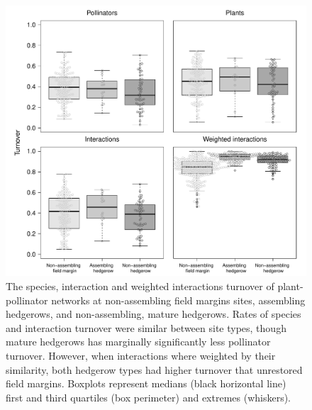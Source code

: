 \documentclass[12pt]{article}
\begin{document}
\begin{figure}
  \centering
  \includegraphics[width=1\textwidth]{../analysis/variability/figures/turnover_panels.pdf}
  \caption{The species, interaction and weighted interactions turnover
    of plant-pollinator networks at non-assembling field margins
    sites, assembling hedgerows, and non-assembling, mature
    hedgerows. Rates of species and interaction turnover were similar
    between site types, though mature hedgerows has marginally
    significantly less pollinator turnover.  However, when
    interactions where weighted by their similarity, both hedgerow
    types had higher turnover that unrestored field margins. Boxplots
    represent medians (black horizontal line) first and third
    quartiles (box perimeter) and extremes (whiskers). }
  \label{fig:beta}
\end{figure}
\clearpage
\end{document}

